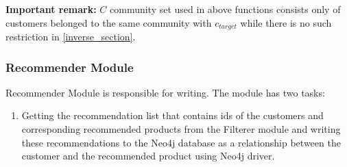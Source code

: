 	
	\textbf{Important remark:} $C$ community set used in above functions consists only of customers belonged to the same community with $c_{target}$ while there is no such restriction in \ref{inverse_section}.

	\subsubsection{Recommender Module} Recommender Module is responsible for writing. The module has two tasks:
	\begin{enumerate}
		\item Getting the recommendation list that contains ids of the customers and corresponding recommended products from the Filterer module and writing these recommendations to the Neo4j database as a relationship between the customer and the recommended product using Neo4j driver.
	\end{enumerate}